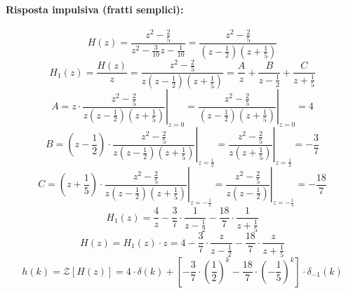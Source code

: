 \documentclass[a4paper,oneside,titlepage]{book}
\begin{document}
\paragraph{Risposta impulsiva (fratti semplici):}
\[ H(z) = \frac{z^2 - \frac{2}{5}}{z^2 - \frac{3}{10} z - \frac{1}{10}} = \frac{z^2 - \frac{2}{5}}{(z - \frac{1}{2})(z + \frac{1}{5})} \]
\[ H_1(z) = \frac{H(z)}{z} = \frac{z^2 - \frac{2}{5}}{z(z - \frac{1}{2})(z + \frac{1}{5})} = \frac{A}{z} + \frac{B}{z - \frac{1}{2}} + \frac{C}{z + \frac{1}{5}} \]
\[
A = \left. z \cdot \frac{z^2 - \frac{2}{5}}{z(z - \frac{1}{2})(z + \frac{1}{5})} \right|_{z=0} = \left. \frac{z^2 - \frac{2}{5}}{(z - \frac{1}{2})(z + \frac{1}{5})} \right|_{z=0} = 4
\]
\[
B = \left. \left( z - \frac{1}{2} \right) \cdot \frac{z^2 - \frac{2}{5}}{z(z - \frac{1}{2})(z + \frac{1}{5})} \right|_{z = \frac{1}{2}} = \left. \frac{z^2 - \frac{2}{5}}{z(z + \frac{1}{5})} \right|_{z = \frac{1}{2}} = - \frac{3}{7}
\]
\[
C = \left. \left( z + \frac{1}{5} \right) \cdot \frac{z^2 - \frac{2}{5}}{z(z - \frac{1}{2})(z + \frac{1}{5})} \right|_{z = - \frac{1}{5}} = \left. \frac{z^2 - \frac{2}{5}}{z(z - \frac{1}{2})} \right|_{z = - \frac{1}{5}} = - \frac{18}{7}
\]
\[ H_1(z) = \frac{4}{z} - \frac{3}{7} \cdot \frac{1}{z - \frac{1}{2}} - \frac{18}{7} \cdot \frac{1}{z + \frac{1}{5}} \]
\[ H(z) = H_1(z) \cdot z = 4 - \frac{3}{7} \cdot \frac{z}{z - \frac{1}{2}} - \frac{18}{7} \cdot \frac{z}{z + \frac{1}{5}} \]
\[
h(k) = \mathcal{Z} [H(z)] = 4 \cdot \delta(k) + \left[ - \frac{3}{7} \cdot \left( \frac{1}{2} \right)^k - \frac{18}{7} \cdot \left( - \frac{1}{5} \right)^k \right] \cdot \delta_{-1}(k)
\]
\end{document}
